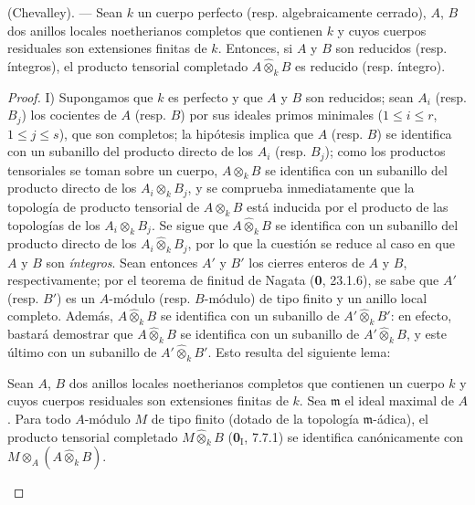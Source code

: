 \begin{corollary}[7.5.7]
\label{IV.2.s7.5.7-fr}
(Chevalley). --- Sean $k$ un cuerpo perfecto \textup{(resp.} algebraicamente cerrado), $A$,
$B$ dos anillos locales noetherianos completos que contienen $k$ y cuyos cuerpos
residuales son extensiones finitas de $k$. Entonces, si $A$ y $B$ son reducidos
\textup{(resp.} íntegros), el producto tensorial completado $A\widehat\otimes_k B$ es
reducido \textup{(resp.} íntegro).
\end{corollary}

\begin{proof}
I) Supongamos que $k$ es perfecto y que $A$ y $B$ son reducidos; sean $A_i$
(resp. $B_j$) los cocientes de $A$ (resp. $B$) por sus ideales primos minimales
($1\leq i\leq r$, $1\leq j\leq s$), que son completos; la hipótesis implica
que $A$ (resp. $B$) se identifica con un subanillo del producto directo de los $A_i$
(resp. $B_j$); como los productos tensoriales se toman sobre un cuerpo,
$A\otimes_kB$ se identifica con un subanillo del producto directo de los
$A_i\otimes_kB_j$, y se comprueba inmediatamente que la topología de producto tensorial
de $A\otimes_kB$ está inducida por el producto de las topologías de los
$A_i\otimes_kB_j$. Se sigue que $A\widehat\otimes_kB$ se identifica con un
subanillo del producto directo de los $A_i\widehat\otimes_kB_j$, por lo que
la cuestión se reduce al caso en que $A$ y $B$ son \emph{íntegros}. Sean entonces $A'$ y $B'$
los cierres enteros de $A$ y $B$, respectivamente; por el teorema de finitud
de Nagata (\textbf 0, 23.1.6), se sabe que $A'$ (resp. $B'$) es un $A$-módulo (resp.
$B$-módulo) de tipo finito y un anillo local completo. Además,
$A\widehat\otimes_kB$ se identifica con un subanillo de
$A'\widehat\otimes_kB'$: en efecto, bastará demostrar que
$A\widehat\otimes_kB$ se identifica con un subanillo de
$A'\widehat\otimes_kB$, y este último con un subanillo de
$A'\widehat\otimes_kB'$. Esto resulta del siguiente lema:

\begin{lemma}[7.5.7.1]
\label{IV.2.s7.5.7.1-fr}
Sean $A$, $B$ dos anillos locales noetherianos completos que contienen un cuerpo
$k$ y cuyos cuerpos residuales son extensiones finitas de $k$. Sea
$\mathfrak m$ el ideal maximal de $A$. Para todo $A$-módulo $M$ de tipo finito
(dotado de la topología $\mathfrak m$-ádica), el producto tensorial completado
$M\widehat\otimes_kB$ \textup{(\textbf 0$_{\mathrm I}$, 7.7.1)} se identifica canónicamente con
$M\otimes_A(A\widehat\otimes_kB)$.
\end{lemma}


\end{proof}

